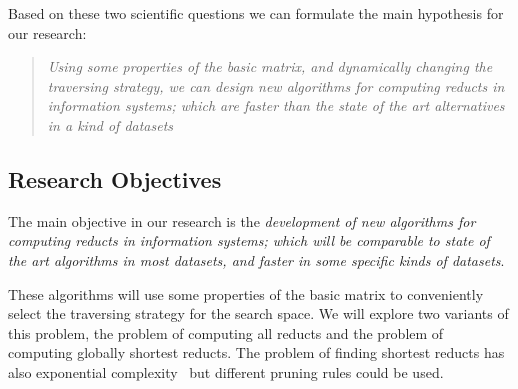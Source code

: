 \documentclass[authoryear,11pt]{elsarticle}
\begin{document}
  Based on these two scientific questions we can formulate the main hypothesis for our research:
  
\begin{quote}
  \emph{Using some properties of the basic matrix, and dynamically changing the traversing 
  		strategy, we can design new algorithms for computing reducts in information systems; which are
  		faster than the state of the art alternatives in a kind of datasets}
\end{quote}  

\subsection{Research Objectives}\label{Goals} 
  The main objective in our research is the \emph{development of new algorithms for computing reducts in
  information systems; which will be comparable to state of the art algorithms 
  in most datasets, and faster in some specific kinds of datasets}. 
  
  These algorithms will use some properties 
  of the basic matrix to conveniently select the traversing strategy for the search space. We will explore two
  variants of this problem, the problem of computing all reducts and the problem of computing globally 
  shortest reducts. The problem of finding shortest reducts has also 
  exponential complexity~\citep{Lin04} but different pruning rules could be used.
  
\end{document}
